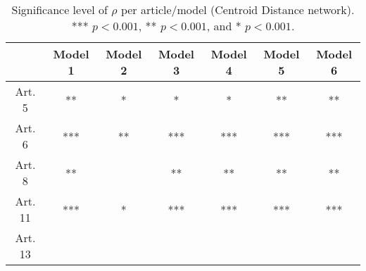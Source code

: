 \begin{table}[ht]
\centering
\begin{tabular}{ccccccc}
  \toprule
 & Model 1 & Model 2 & Model 3 & Model 4 & Model 5 & Model 6 \\ 
  \midrule
Art. 5 & ** & * & * & * & ** & ** \\ 
   \midrule
Art. 6 & *** & ** & *** & *** & *** & *** \\ 
   \midrule
Art. 8 & ** &   & ** & ** & ** & ** \\ 
   \midrule
Art. 11 & *** & * & *** & *** & *** & *** \\ 
   \midrule
Art. 13 &   &   &   &   &   &   \\ 
   \bottomrule
\end{tabular}
\caption{Significance level of $\rho$ per article/model (Centroid Distance network). *** $p < 0.001$, ** $p < 0.001$, and * $p < 0.001$.} 
\end{table}
